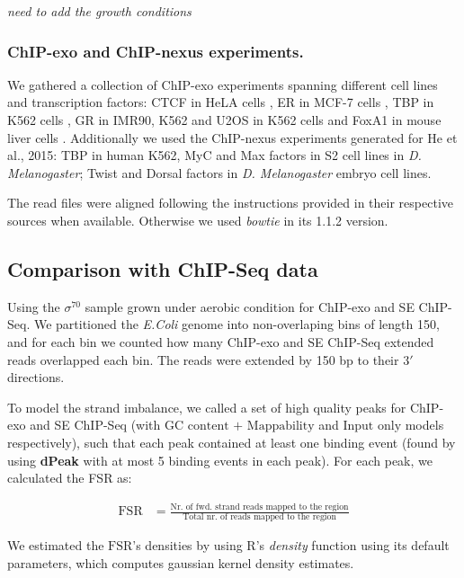 \documentclass{bmcart}\usepackage[]{graphicx}\usepackage[]{color}
\newcommand{\sig}{\sigma^{70}}
\begin{document}
{\color{red}\emph{need to add the growth conditions}}

\subsubsection*{ChIP-exo and ChIP-nexus experiments.}

We gathered a collection of ChIP-exo experiments spanning different
cell lines and transcription factors: CTCF in HeLA cells \cite{exo1},
ER in MCF-7 cells \cite{exoillumina}, TBP in K562 cells
\cite{venters13}, GR in IMR90, K562 and U2OS in K562 cells
\cite{starick15} and FoxA1 in mouse liver cells
\cite{exoillumina}. Additionally we used the ChIP-nexus experiments
generated for He et al., 2015: TBP in human K562, MyC and Max factors
in S2 cell lines in \emph{D. Melanogaster}; Twist and Dorsal factors
in \emph{D. Melanogaster} embryo cell lines.

The read files were aligned following the instructions provided in
their respective sources when available. Otherwise we used
\emph{bowtie} in its 1.1.2 version.

\subsection*{Comparison with ChIP-Seq data}



Using the $\sig$ sample grown under aerobic condition for ChIP-exo and
SE ChIP-Seq. We partitioned the \emph{E.Coli} genome into
non-overlaping bins of length 150, and for each bin we
counted how many ChIP-exo and SE ChIP-Seq extended reads overlapped
each bin. The reads were extended by 150 bp to their
$3\prime$ directions.

To model the strand imbalance, we called a set of high quality peaks
for ChIP-exo and SE ChIP-Seq (with $\mbox{GC content + Mappability}$
and $\mbox{Input only}$ models respectively), such that each peak
contained at least one binding event (found by using \textbf{dPeak}
with at most 5 binding events in each peak). For each peak, we
calculated the FSR as:

\begin{align*}
    \mbox{FSR} &= \frac{\text{Nr. of fwd. strand reads mapped to the region}}                 {\text{Total nr. of reads mapped to the region}} 
\end{align*}

We estimated the $\mbox{FSR}$'s densities by using R's \emph{density}
function using its default parameters, which computes gaussian kernel
density estimates.
\end{document}

